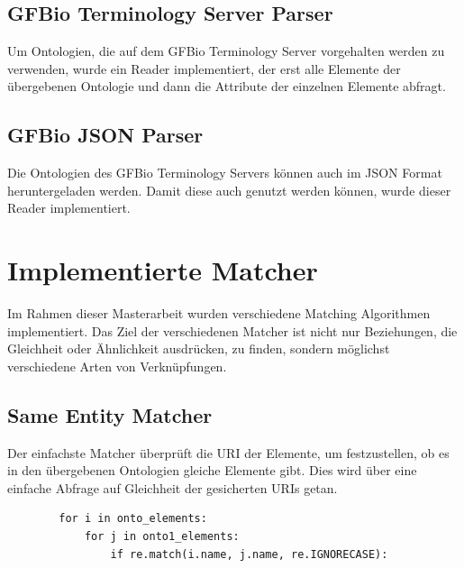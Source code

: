 		\subsection{GFBio Terminology Server Parser}
		Um Ontologien, die auf dem GFBio Terminology Server vorgehalten werden zu
		verwenden, wurde ein Reader implementiert, der erst alle Elemente der
		übergebenen Ontologie und dann die Attribute der einzelnen Elemente abfragt.
		
		\subsection{GFBio JSON Parser}
		Die Ontologien des GFBio Terminology Servers können auch im JSON Format
		heruntergeladen werden. Damit diese auch genutzt werden können, wurde
		dieser Reader implementiert. 
		
		\section{Implementierte Matcher}
		\label{ImplementierteMatcher}
		Im Rahmen dieser Masterarbeit wurden verschiedene Matching Algorithmen
		implementiert. Das Ziel der verschiedenen Matcher ist nicht nur Beziehungen,
		die Gleichheit oder Ähnlichkeit ausdrücken, zu finden, sondern möglichst
		verschiedene Arten von Verknüpfungen.
		
		\subsection{Same Entity Matcher}
		Der einfachste Matcher überprüft die URI der Elemente, um festzustellen, ob es
		in den übergebenen Ontologien gleiche Elemente gibt. Dies wird über eine
		einfache Abfrage auf Gleichheit der gesicherten URIs getan.
		\begin{lstlisting}
		for i in onto_elements:
			for j in onto1_elements:
				if re.match(i.name, j.name, re.IGNORECASE):
		\end{lstlisting}
		
